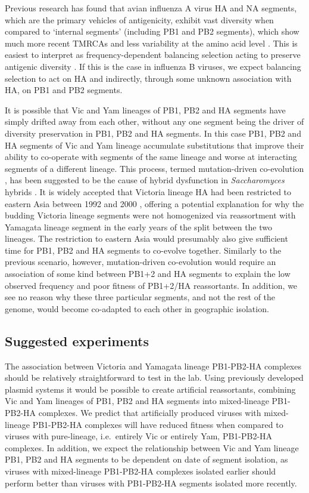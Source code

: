 \documentclass[11pt,oneside,letterpaper]{article}
\begin{document}
Previous research has found that avian influenza A virus HA and NA segments, which are the primary vehicles of antigenicity, exhibit vast diversity when compared to `internal segments' (including PB1 and PB2 segments), which show much more recent TMRCAs and less variability at the amino acid level \citep{chen2006,obenauer2006}.
This is easiest to interpret as frequency-dependent balancing selection acting to preserve antigenic diversity \citep{worobey2014}.
If this is the case in influenza B viruses, we expect balancing selection to act on HA and indirectly, through some unknown association with HA, on PB1 and PB2 segments.

It is possible that Vic and Yam lineages of PB1, PB2 and HA segments have simply drifted away from each other, without any one segment being the driver of diversity preservation in PB1, PB2 and HA segments.
In this case PB1, PB2 and HA segments of Vic and Yam lineage accumulate substitutions that improve their ability to co-operate with segments of the same lineage and worse at interacting segments of a different lineage.
This process, termed mutation-driven co-evolution \citep{presgraves2010}, has been suggested to be the cause of hybrid dysfunction in \textit{Saccharomyces} hybrids \citep{lee2008}.
It is widely accepted that Victoria lineage HA had been restricted to eastern Asia between 1992 and 2000 \citep{nerome1998,shaw2002}, offering a potential explanation for why the budding Victoria lineage segments were not homogenized via reassortment with Yamagata lineage segment in the early years of the split between the two lineages. 
The restriction to eastern Asia would presumably also give sufficient time for PB1, PB2 and HA segments to co-evolve together.
Similarly to the previous scenario, however, mutation-driven co-evolution would require an association of some kind between PB1+2 and HA segments to explain the low observed frequency and poor fitness of PB1+2/HA reassortants.
In addition, we see no reason why these three particular segments, and not the rest of the genome, would become co-adapted to each other in geographic isolation.

\subsection*{Suggested experiments}
The association between Victoria and Yamagata lineage PB1-PB2-HA complexes should be relatively straightforward to test in the lab.
Using previously developed plasmid systems \citep{hoffmann2002} it would be possible to create artificial reassortants, combining Vic and Yam lineages of PB1, PB2 and HA segments into mixed-lineage PB1-PB2-HA complexes.
We predict that artificially produced viruses with mixed-lineage PB1-PB2-HA complexes will have reduced fitness when compared to viruses with pure-lineage, i.e.\ entirely Vic or entirely Yam, PB1-PB2-HA complexes.
In addition, we expect the relationship between Vic and Yam lineage PB1, PB2 and HA segments to be dependent on date of segment isolation, as viruses with mixed-lineage PB1-PB2-HA complexes isolated earlier should perform better than viruses with PB1-PB2-HA segments isolated more recently.
\end{document}
